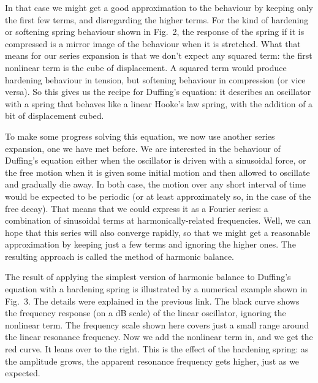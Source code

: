   In that case we might get a good approximation to the behaviour by keeping 
  only the first few terms, and disregarding the higher terms. For the kind of 
  hardening or softening spring behaviour shown in Fig.\ 2, the response of the 
  spring if it is compressed is a mirror image of the behaviour when it is 
  stretched. What that means for our series expansion is that we don’t expect 
  any squared term: the first nonlinear term is the cube of displacement. A 
  squared term would produce hardening behaviour in tension, but softening 
  behaviour in compression (or vice versa). So this gives us the recipe for 
  Duffing’s equation: it describes an oscillator with a spring that behaves 
  like a linear Hooke’s law spring, with the addition of a bit of displacement 
  cubed. 

  To make some progress solving this equation, we now use another series 
  expansion, one we have met before. We are interested in the behaviour of 
  Duffing’s equation either when the oscillator is driven with a sinusoidal 
  force, or the free motion when it is given some initial motion and then 
  allowed to oscillate and gradually die away. In both case, the motion over 
  any short interval of time would be expected to be periodic (or at least 
  approximately so, in the case of the free decay). That means that we could 
  express it as a Fourier series: a combination of sinusoidal terms at 
  harmonically-related frequencies. Well, we can hope that this series will 
  also converge rapidly, so that we might get a reasonable approximation by 
  keeping just a few terms and ignoring the higher ones. The resulting approach 
  is called the method of harmonic balance. 

  The result of applying the simplest version of harmonic balance to Duffing's 
  equation with a hardening spring is illustrated by a numerical example shown 
  in Fig.\ 3. The details were explained in the previous link. The black curve 
  shows the frequency response (on a dB scale) of the linear oscillator, 
  ignoring the nonlinear term. The frequency scale shown here covers just a 
  small range around the linear resonance frequency. Now we add the nonlinear 
  term in, and we get the red curve. It leans over to the right. This is the 
  effect of the hardening spring: as the amplitude grows, the apparent 
  resonance frequency gets higher, just as we expected. 


